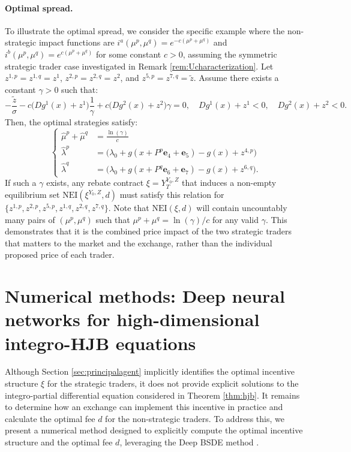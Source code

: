 \documentclass[12pt]{article}
\begin{document}
\paragraph{Optimal spread.}
To illustrate the optimal spread, we consider the specific example where the non-strategic impact functions are $i^a(\mu^p, \mu^q) = e^{-c(\mu^p + \mu^q)}$ and $i^b(\mu^p, \mu^q) = e^{c(\mu^p + \mu^q)}$ for some constant $c>0$, assuming the symmetric strategic trader case investigated in Remark \ref{rem:Ucharacterization}. Let $z^{1,p} = z^{1,q} = z^1$, $z^{2,p} = z^{2,q} = z^2$, and $z^{5,p} = z^{7,q} = \tilde{z}$. Assume there exists a constant $\gamma > 0$ such that:
\begin{equation}\label{eq:gamma_nash}
    -\frac{\tilde{z}}{\sigma} - c\big(Dg^1(x) + z^1\big)\frac{1}{\gamma} + c\big(Dg^2(x) + z^2\big)\gamma = 0, \quad Dg^1(x) + z^1 < 0, \quad Dg^2(x) + z^2 < 0.
\end{equation}
Then, the optimal strategies satisfy:
\[ 
\begin{cases}
    \hat{\mu}^p + \hat{\mu}^q &= \frac{\ln(\gamma)}{c} \\[0.5em]
    \hat{\lambda}^p &= \big( \lambda_0 + g(x + P^p\mathbf{e}_4 + \mathbf{e}_5) - g(x) + z^{4,p} \big) \\[0.5em]
    \hat{\lambda}^q &= \big( \lambda_0 + g(x + P^q\mathbf{e}_6 + \mathbf{e}_7) - g(x) + z^{6,q} \big).
\end{cases}
\]
If such a $\gamma$ exists, any rebate contract $\xi = Y_T^{Y_0,Z}$ that induces a non-empty equilibrium set $\text{NEI}(\xi^{Y_0,Z},d)$ must satisfy this relation for $\{z^{1,p}, z^{2,p}, z^{5,p}, z^{1,q}, z^{2,q}, z^{7,q}\}$. Note that $\text{NEI}(\xi,d)$ will contain uncountably many pairs of $(\mu^p, \mu^q)$ such that $\mu^p + \mu^q = \ln(\gamma)/c$ for any valid $\gamma$. This demonstrates that it is the combined price impact of the two strategic traders that matters to the market and the exchange, rather than the individual proposed price of each trader.

\section{Numerical methods: Deep neural networks for high-dimensional integro-HJB equations}
\label{sec:neural}

Although Section \ref{sec:principalagent} implicitly identifies the optimal incentive structure $\xi$ for the strategic traders, it does not provide explicit solutions to the integro-partial differential equation considered in Theorem \ref{thm:hjb}. It remains to determine how an exchange can implement this incentive in practice and calculate the optimal fee $d$ for the non-strategic traders. To address this, we present a numerical method designed to explicitly compute the optimal incentive structure and the optimal fee $d$, leveraging the Deep BSDE method \cite{crandall1983viscosity,henry2017deep,han2020convergence,ji2020three,ji2022deep}. \vspace{0.5em}
\end{document}
